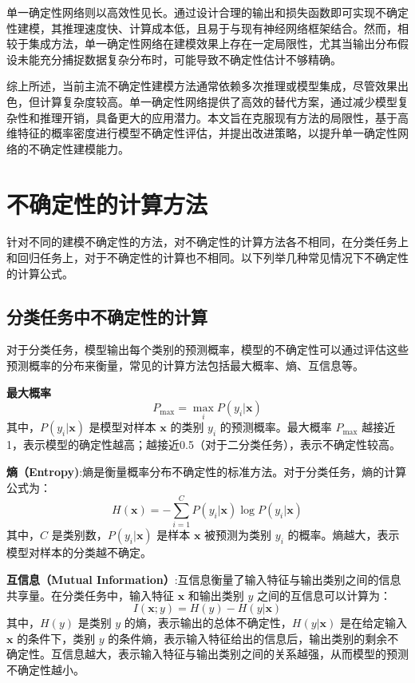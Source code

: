 单一确定性网络则以高效性见长。通过设计合理的输出和损失函数即可实现不确定性建模，其推理速度快、计算成本低，且易于与现有神经网络框架结合。然而，相较于集成方法，单一确定性网络在建模效果上存在一定局限性，尤其当输出分布假设未能充分捕捉数据复杂分布时，可能导致不确定性估计不够精确。  

综上所述，当前主流不确定性建模方法通常依赖多次推理或模型集成，尽管效果出色，但计算复杂度较高。单一确定性网络提供了高效的替代方案，通过减少模型复杂性和推理开销，具备更大的应用潜力。本文旨在克服现有方法的局限性，基于高维特征的概率密度进行模型不确定性评估，并提出改进策略，以提升单一确定性网络的不确定性建模能力。

\section{不确定性的计算方法}
针对不同的建模不确定性的方法，对不确定性的计算方法各不相同，在分类任务上和回归任务上，对于不确定性的计算也不相同。以下列举几种常见情况下不确定性的计算公式。

\subsection{分类任务中不确定性的计算}

对于分类任务，模型输出每个类别的预测概率，模型的不确定性可以通过评估这些预测概率的分布来衡量，常见的计算方法包括最大概率\cite{hendrycks2017a}、熵\cite{wimmer2023quantifying}、互信息\cite{wimmer2023quantifying}等。

\textbf{最大概率}
    \[
    P_{\text{max}} = \max_{i} P(y_i | \mathbf{x})
    \]
    其中，\( P(y_i | \mathbf{x}) \) 是模型对样本 \( \mathbf{x} \) 的类别 \( y_i \) 的预测概率。最大概率 \( P_{\text{max}} \) 越接近1，表示模型的确定性越高；越接近0.5（对于二分类任务），表示不确定性较高。


\textbf{熵（Entropy)}:熵是衡量概率分布不确定性的标准方法。对于分类任务，熵的计算公式为：
\[
H(\mathbf{x}) = - \sum_{i=1}^{C} P(y_i | \mathbf{x}) \log P(y_i | \mathbf{x})
\]
其中，\( C \) 是类别数，\( P(y_i | \mathbf{x}) \) 是样本 \( \mathbf{x} \) 被预测为类别 \( y_i \) 的概率。熵越大，表示模型对样本的分类越不确定。


\textbf{互信息（Mutual Information）}:互信息衡量了输入特征与输出类别之间的信息共享量。在分类任务中，输入特征 \( \mathbf{x} \) 和输出类别 \( y \) 之间的互信息可以计算为：
\[
I(\mathbf{x}; y) = H(y) - H(y | \mathbf{x})
\]
其中，\( H(y) \) 是类别 \( y \) 的熵，表示输出的总体不确定性，\( H(y | \mathbf{x}) \) 是在给定输入 \( \mathbf{x} \) 的条件下，类别 \( y \) 的条件熵，表示输入特征给出的信息后，输出类别的剩余不确定性。互信息越大，表示输入特征与输出类别之间的关系越强，从而模型的预测不确定性越小。

